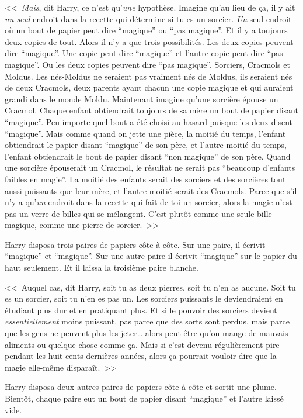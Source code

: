 <<~\emph{Mais}, dit Harry, ce n'est qu'\emph{une} hypothèse. Imagine qu'au lieu de ça, il y ait \emph{un seul} endroit dans la recette qui détermine si tu es un sorcier. \emph{Un} seul endroit où un bout de papier peut dire “magique” ou “pas magique”. Et il y a toujours deux copies de tout. Alors il n'y a que trois possibilités. Les deux copies peuvent dire “magique”. Une copie peut dire “magique” et l'autre copie peut dire “pas magique”. Ou les deux copies peuvent dire “pas magique”. Sorciers, Cracmols et Moldus. Les nés-Moldus ne seraient pas vraiment nés de Moldus, ils seraient nés de deux Cracmols, deux parents ayant chacun une copie magique et qui auraient grandi dans le monde Moldu. Maintenant imagine qu'une sorcière épouse un Cracmol. Chaque enfant obtiendrait toujours de sa mère un bout de papier disant “magique”. Peu importe quel bout a été choisi au hasard puisque les deux disent “magique”. Mais comme quand on jette une pièce, la moitié du temps, l'enfant obtiendrait le papier disant “magique” de son père, et l'autre moitié du temps, l'enfant obtiendrait le bout de papier disant “non magique” de son père. Quand une sorcière épouserait un Cracmol, le résultat ne serait pas “beaucoup d'enfants faibles en magie”. La moitié des enfants serait des sorciers et des sorcières tout aussi puissants que leur mère, et l'autre moitié serait des Cracmols. Parce que s'il n'y a qu'\emph{un} endroit dans la recette qui fait de toi un sorcier, alors la magie n'est pas un verre de billes qui se mélangent. C'est plutôt comme une seule bille magique, comme une pierre de sorcier.~>>

Harry disposa trois paires de papiers côte à côte. Sur une paire, il écrivit “magique” et “magique”. Sur une autre paire il écrivit “magique” sur le papier du haut seulement. Et il laissa la troisième paire blanche.

<<~Auquel cas, dit Harry, soit tu as deux pierres, soit tu n'en as aucune. Soit tu es un sorcier, soit tu n'en es pas un. Les sorciers puissants le deviendraient en étudiant plus dur et en pratiquant plus. Et si le pouvoir des sorciers devient \emph{essentiellement} moins puissant, pas parce que des sorts sont perdus, mais parce que les gens ne peuvent plus les jeter… alors peut-être qu'on mange de mauvais aliments ou quelque chose comme ça. Mais si c'est devenu régulièrement pire pendant les huit-cents dernières années, alors ça pourrait vouloir dire que la magie elle-même disparaît.~>>

Harry disposa deux autres paires de papiers côte à côte et sortit une plume. Bientôt, chaque paire eut un bout de papier disant “magique” et l'autre laissé vide.

